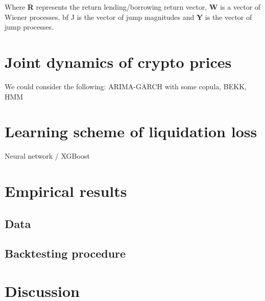 \documentclass{article} %
\theoremstyle{plain}
\theoremstyle{definition} %
\begin{document}
Where {\bf R} represents the return lending/borrowing return vector, {\bf W} is a vector of Wiener processes,
 {bf J} is the vector of jump magnitudes and {\bf Y} is the vector of jump processes.


\section{Joint dynamics of crypto prices}
We could consider the following: ARIMA-GARCH with some copula, BEKK, HMM

\section{Learning scheme of liquidation loss}\label{sec:ML}
Neural network / XGBoost

\section{Empirical results}
\subsection{Data}
\subsection{Backtesting procedure}

\section{Discussion}

\end{document}
